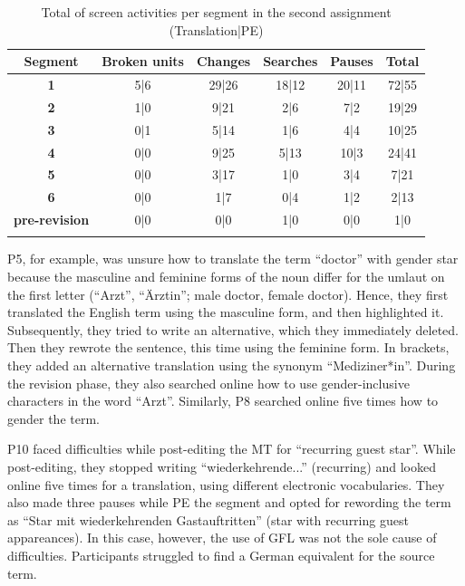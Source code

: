 \begin{table}[ht]
    \caption[Total of screen activities per segment in the second assignment]{Total of screen activities per segment in the second assignment (Translation|PE)}
    \centering
    \begin{tabular}{cccccc} \lsptoprule
        \textbf{Segment} & \textbf{Broken units} & \textbf{Changes} & \textbf{Searches} & \textbf{Pauses} & \textbf{Total}\\
\midrule
        \textbf{1} & 5|6 & \cellcolor{red!25}29|26 & \cellcolor{red!25}18|12 & \cellcolor{red!25}20|11 & \cellcolor{red!25}72|55 \\
        \textbf{2} & 1|0 & 9|21 & 2|6 & 7|2 & 19|29 \\
        \textbf{3} & 0|1 & 5|14 & 1|6 & 4|4 & 10|25 \\
        \textbf{4} & 0|0 & \cellcolor{red!25}9|25 & \cellcolor{red!25}5|13 & \cellcolor{red!25}10|3 & \cellcolor{red!25}24|41 \\
        \textbf{5} & 0|0 & 3|17 & 1|0 & 3|4 & 7|21 \\
        \textbf{6} & 0|0 & 1|7 & 0|4 & 1|2 & 2|13 \\
        \textbf{pre-revision} & 0|0 & 0|0 & 1|0 & 0|0 & 1|0 \\
\lspbottomrule
    \end{tabular}
    \label{tab:technicaleffort_segment_second}
\end{table}

P5, for example, was unsure how to translate the term ``doctor'' with gender star because the masculine and feminine forms of the noun differ for the umlaut on the first letter (``Arzt'', ``Ärztin''; male doctor, female doctor). Hence, they first translated the English term using the masculine form, and then highlighted it. Subsequently, they tried to write an alternative, which they immediately deleted. Then they rewrote the sentence, this time using the feminine form. In brackets, they added an alternative translation using the synonym ``Mediziner*in''. During the revision phase, they also searched online how to use gender-inclusive characters in the word ``Arzt''. Similarly, P8 searched online five times how to gender the term. 

P10 faced difficulties while post-editing the MT for ``recurring guest star''. While post-editing, they stopped writing ``wiederkehrende...'' (recurring) and looked online five times for a translation, using different electronic vocabularies. They also made three pauses while PE the segment and opted for rewording the term as ``Star mit wiederkehrenden Gastauftritten'' (star with recurring guest appareances). In this case, however, the use of GFL was not the sole cause of difficulties. Participants struggled to find a German equivalent for the source term. 

